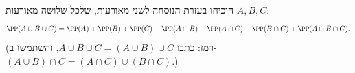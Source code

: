 הוכיחו בעזרת הנוסחה לשני מאורעות, שלכל שלושה מאורעות $A,B,C$:
\[
\PP(A\cup B\cup C)=\PP(A)+\PP(B)+\PP(C)-\PP(A\cap B)-\PP(A\cap C)-\PP(B\cap C)+\PP(A\cap B\cap C).
\]
(רמז: כתבו $A\cup B\cup C=(A\cup B)\cup C$, והשתמשו ב-$(A\cup B)\cap C=(A\cap C)\cup(B\cap C)$.)
